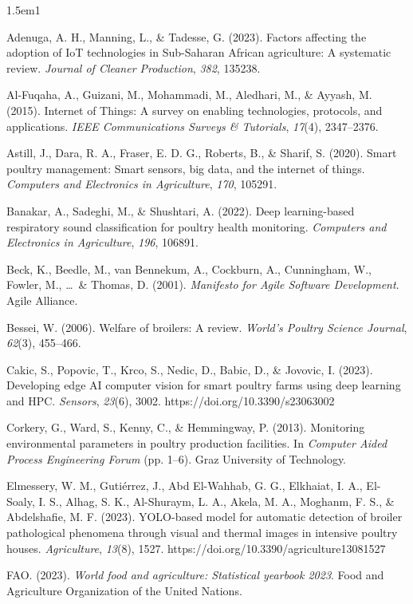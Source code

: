 \documentclass[12pt,a4paper]{report}
\begin{document}
\begin{hangparas}{1.5em}{1}

Adenuga, A. H., Manning, L., \& Tadesse, G. (2023). Factors affecting the adoption of IoT technologies in Sub-Saharan African agriculture: A systematic review. \textit{Journal of Cleaner Production}, \textit{382}, 135238.

Al-Fuqaha, A., Guizani, M., Mohammadi, M., Aledhari, M., \& Ayyash, M. (2015). Internet of Things: A survey on enabling technologies, protocols, and applications. \textit{IEEE Communications Surveys \& Tutorials}, \textit{17}(4), 2347--2376.

Astill, J., Dara, R. A., Fraser, E. D. G., Roberts, B., \& Sharif, S. (2020). Smart poultry management: Smart sensors, big data, and the internet of things. \textit{Computers and Electronics in Agriculture}, \textit{170}, 105291.

Banakar, A., Sadeghi, M., \& Shushtari, A. (2022). Deep learning-based respiratory sound classification for poultry health monitoring. \textit{Computers and Electronics in Agriculture}, \textit{196}, 106891.

Beck, K., Beedle, M., van Bennekum, A., Cockburn, A., Cunningham, W., Fowler, M., \ldots\ \& Thomas, D. (2001). \textit{Manifesto for Agile Software Development}. Agile Alliance.

Bessei, W. (2006). Welfare of broilers: A review. \textit{World's Poultry Science Journal}, \textit{62}(3), 455--466.

Cakic, S., Popovic, T., Krco, S., Nedic, D., Babic, D., \& Jovovic, I. (2023). Developing edge AI computer vision for smart poultry farms using deep learning and HPC. \textit{Sensors}, \textit{23}(6), 3002. https://doi.org/10.3390/s23063002

Corkery, G., Ward, S., Kenny, C., \& Hemmingway, P. (2013). Monitoring environmental parameters in poultry production facilities. In \textit{Computer Aided Process Engineering Forum} (pp. 1--6). Graz University of Technology.

Elmessery, W. M., Guti\'errez, J., Abd El-Wahhab, G. G., Elkhaiat, I. A., El-Soaly, I. S., Alhag, S. K., Al-Shuraym, L. A., Akela, M. A., Moghanm, F. S., \& Abdelshafie, M. F. (2023). YOLO-based model for automatic detection of broiler pathological phenomena through visual and thermal images in intensive poultry houses. \textit{Agriculture}, \textit{13}(8), 1527. https://doi.org/10.3390/agriculture13081527

FAO. (2023). \textit{World food and agriculture: Statistical yearbook 2023}. Food and Agriculture Organization of the United Nations.


\end{hangparas}
\end{document}
